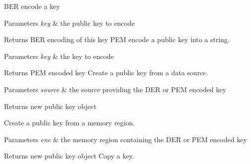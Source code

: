B\+ER encode a key 
\begin{DoxyParams}{Parameters}
{\em key} & the public key to encode \\
\hline
\end{DoxyParams}
\begin{DoxyReturn}{Returns}
B\+ER encoding of this key P\+EM encode a public key into a string. 
\end{DoxyReturn}

\begin{DoxyParams}{Parameters}
{\em key} & the key to encode \\
\hline
\end{DoxyParams}
\begin{DoxyReturn}{Returns}
P\+EM encoded key Create a public key from a data source. 
\end{DoxyReturn}

\begin{DoxyParams}{Parameters}
{\em source} & the source providing the D\+ER or P\+EM encoded key \\
\hline
\end{DoxyParams}
\begin{DoxyReturn}{Returns}
new public key object
\end{DoxyReturn}
Create a public key from a memory region. 
\begin{DoxyParams}{Parameters}
{\em enc} & the memory region containing the D\+ER or P\+EM encoded key \\
\hline
\end{DoxyParams}
\begin{DoxyReturn}{Returns}
new public key object Copy a key. 
\end{DoxyReturn}

